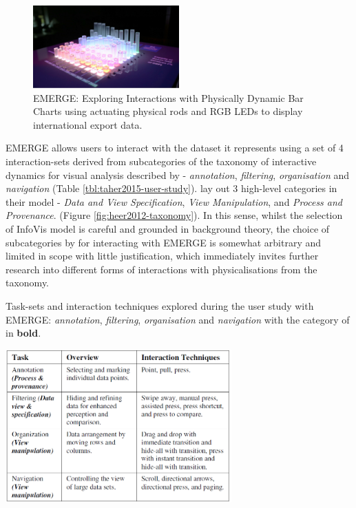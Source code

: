 \documentclass[11pt]{article}
\begin{document}
\begin{figure}[H]
\centering
\includegraphics[width=0.5\textwidth]{img/taher2015-emerge.png} 
\caption{EMERGE: Exploring Interactions with Physically Dynamic Bar Charts using actuating physical rods and RGB LEDs to display international export data.}\label{fig:taher2015-emerge}
\end{figure}

EMERGE allows users to interact with the dataset it represents using a set of 4 interaction-sets derived from subcategories of the taxonomy of interactive dynamics for visual analysis described by \citet{heer2012} - \textit{annotation}, \textit{filtering}, \textit{organisation} and \textit{navigation} (Table \ref{tbl:taher2015-user-study}). \citeauthor{heer2012} lay out 3 high-level categories in their model - \textit{Data and View Specification}, \textit{View Manipulation}, and \textit{Process and Provenance}. (Figure \ref{fig:heer2012-taxonomy}). In this sense, whilst the selection of InfoVis model is careful and grounded in background theory, the choice of subcategories by \citeauthor{taher2015} for interacting with EMERGE is somewhat arbitrary and limited in scope with little justification, which immediately invites further research into different forms of interactions with physicalisations from the taxonomy.

\begin{table}[H]
\centering
\caption{Task-sets and interaction techniques explored during the user study with EMERGE: \textit{annotation}, \textit{filtering}, \textit{organisation} and \textit{navigation} with the category of \protect\citet{heer2012} in \textbf{bold}.}\label{tbl:taher2015-user-study}
\includegraphics[width=0.65\textwidth]{img/taher2015-user-study.png} 
\end{table}
\end{document}
